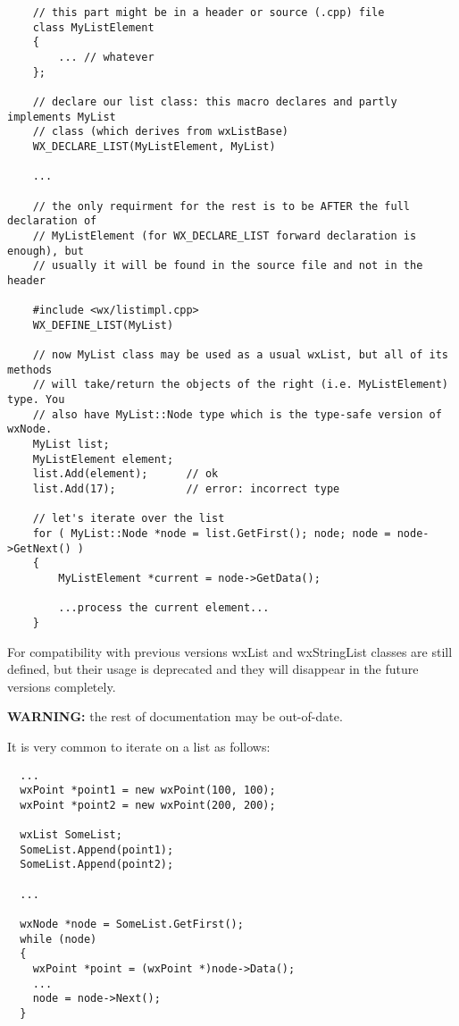{\small%
\begin{verbatim}
    // this part might be in a header or source (.cpp) file
    class MyListElement
    {
        ... // whatever
    };

    // declare our list class: this macro declares and partly implements MyList
    // class (which derives from wxListBase)
    WX_DECLARE_LIST(MyListElement, MyList)

    ...

    // the only requirment for the rest is to be AFTER the full declaration of
    // MyListElement (for WX_DECLARE_LIST forward declaration is enough), but
    // usually it will be found in the source file and not in the header

    #include <wx/listimpl.cpp>
    WX_DEFINE_LIST(MyList)

    // now MyList class may be used as a usual wxList, but all of its methods
    // will take/return the objects of the right (i.e. MyListElement) type. You
    // also have MyList::Node type which is the type-safe version of wxNode.
    MyList list;
    MyListElement element;
    list.Add(element);      // ok
    list.Add(17);           // error: incorrect type

    // let's iterate over the list
    for ( MyList::Node *node = list.GetFirst(); node; node = node->GetNext() )
    {
        MyListElement *current = node->GetData();

        ...process the current element...
    }
\end{verbatim}
}

For compatibility with previous versions wxList and wxStringList classes are
still defined, but their usage is deprecated and they will disappear in the
future versions completely.



{\bf WARNING: } the rest of documentation may be out-of-date.


It is very common to iterate on a list as follows:

\begin{verbatim}
  ...
  wxPoint *point1 = new wxPoint(100, 100);
  wxPoint *point2 = new wxPoint(200, 200);

  wxList SomeList;
  SomeList.Append(point1);
  SomeList.Append(point2);

  ...

  wxNode *node = SomeList.GetFirst();
  while (node)
  {
    wxPoint *point = (wxPoint *)node->Data();
    ...
    node = node->Next();
  }
\end{verbatim}


